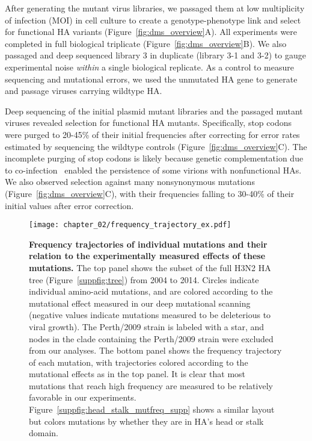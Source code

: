 After generating the mutant virus libraries, we passaged them at low multiplicity of infection (MOI) in cell culture to create a genotype-phenotype link and select for functional HA variants (Figure~\ref{fig:dms_overview}A).
All experiments were completed in full biological triplicate (Figure~\ref{fig:dms_overview}B).
We also passaged and deep sequenced library 3 in duplicate (library 3-1 and 3-2) to gauge experimental noise \textit{within} a single biological replicate.
As a control to measure sequencing and mutational errors, we used the unmutated HA gene to generate and passage viruses carrying wildtype HA.

Deep sequencing of the initial plasmid mutant libraries and the passaged mutant viruses revealed selection for functional HA mutants.
Specifically, stop codons were purged to 20-45\% of their initial frequencies after correcting for error rates estimated by sequencing the wildtype controls (Figure~\ref{fig:dms_overview}C).
The incomplete purging of stop codons is likely because genetic complementation due to co-infection~\citep{marshall2013influenza, brooke2013most} enabled the persistence of some virions with nonfunctional HAs.
We also observed selection against many nonsynonymous mutations (Figure~\ref{fig:dms_overview}C), with their frequencies falling to 30-40\% of their initial values after error correction.

\begin{figure}
  \centering
  \texttt{[image: chapter\_02/frequency\_trajectory\_ex.pdf]}
  \caption[{Frequency trajectories of individual mutations and their relation to the experimentally measured effects of these mutations.}]{\label{fig:frequency_trajectory}
    {\bf Frequency trajectories of individual mutations and their relation to the experimentally measured effects of these mutations.}
    The top panel shows the subset of the full H3N2 HA tree (Figure~\ref{suppfig:tree}) from 2004 to 2014.
    Circles indicate individual amino-acid mutations, and are colored according to the mutational effect measured in our deep mutational scanning (negative values indicate mutations measured to be deleterious to viral growth).
    The Perth/2009 strain is labeled with a star, and nodes in the clade containing the Perth/2009 strain were excluded from our analyses.
    The bottom panel shows the frequency trajectory of each mutation, with trajectories colored according to the mutational effects as in the top panel.
    It is clear that most mutations that reach high frequency are measured to be relatively favorable in our experiments.
    Figure~\ref{suppfig:head_stalk_mutfreq_supp} shows a similar layout but colors mutations by whether they are in HA's head or stalk domain.
}
\end{figure}

